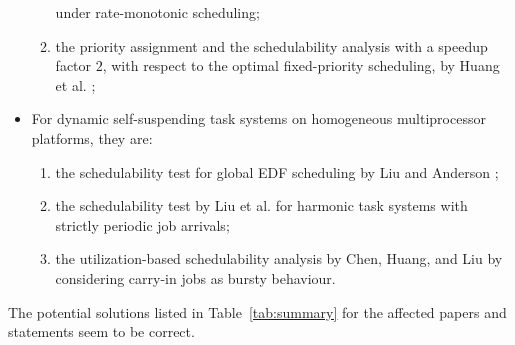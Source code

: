 \begin{itemize}
\begin{enumerate}
    \cite{LiuChen:rtss2014} under rate-monotonic scheduling;
  \item the priority assignment and the schedulability analysis with a
    speedup factor $2$, with respect to the optimal fixed-priority
    scheduling, by Huang et
    al. \cite{huangpass:dac2015};
  \end{enumerate}
\item For dynamic self-suspending task systems on homogeneous multiprocessor
  platforms, they are:
  \begin{enumerate}
  \item the schedulability test for global EDF scheduling by Liu and
    Anderson \cite{DBLP:conf/ecrts/LiuA13};
  \item the schedulability test by Liu et
    al. \cite{DBLP:conf/ecrts/LiuCH014} for harmonic task
    systems with strictly periodic job arrivals;
  \item the utilization-based schedulability analysis by Chen, Huang,
    and Liu \cite{ChenHLRTSS2015} by considering carry-in jobs as
    bursty behaviour.
  \end{enumerate}
\end{itemize}
The potential solutions listed in Table~\ref{tab:summary} for the
affected papers and statements seem to be correct.






